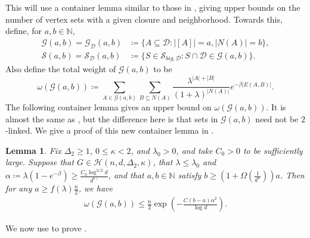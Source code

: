 \documentclass[reqno,a4paper,11pt]{amsart}
\newtheorem{lemma}[theorem]{Lemma}
\newcommand{\cD}{\mathcal{D}}
\newcommand{\cG}{\mathcal{G}}
\newcommand{\cS}{\mathcal{S}}
\newcommand{\lam}{\lambda}
\newcommand{\om}{\omega}
\newcommand{\ex}{\kappa}
\newcommand{\exx}{C_*}
\newcommand{\codeg}{\Delta_2}
\begin{document}
This will use a container lemma similar to those in \cite{galvin2011threshold, GaTe2006, GeKaSaWdo25, jenssen2020independent}, giving upper bounds on the number of vertex sets with a given closure and neighborhood. Towards this, define, for $a, b \in \mathbb{N}$,
\begin{align*}
\cG(a, b) = \cG_{\cD}(a, b) &\coloneqq \{A \subseteq \cD : |[A]|=a, |N(A)|=b\},\\
%
\cS(a, b) = \cS_{\cD}(a, b) &\coloneqq \{S \in \cS_{big, \cD} : S \cap \cD \in \cG(a, b)\}.
\end{align*}
Also define the total weight of $\cG(a, b)$ to be
\[
\omega(\cG(a,b)) \coloneqq \sum_{A \in \cG(a, b)} \sum_{B \subseteq N(A)} \frac{\lambda^{|A|+|B|}}{(1+\lambda)^{|N(A)|}} e^{- \beta |E(A, B)|}.
\] 
The following container lemma gives an upper bound on $\om(\cG(a, b))$. It is almost the same as \cite[Lemma 4.2]{GeKaSaWdo25}, but the difference here is that sets in $\cG(a, b)$ need not be $2$-linked. We give a proof of this new container lemma in .

\begin{lemma} \label{lem:container_main}
Fix $\codeg \ge 1$, $0 \le \ex < 2$, and $\lam_0 > 0$, and take $C_0 > 0$ to be sufficiently large. Suppose that $G \in \mathcal{H}(n,d,\codeg,\ex)$, that $\lambda \le \lam_0$ and $\alpha \coloneqq \lam(1 - e^{-\beta}) \ge \frac{C_0 \log^{3/2} d}{d^{\exx}}$, and that $a,b \in \mathbb{N}$ satisfy $b \ge \left(1 + \Omega\left(\frac{1}{d^{\ex}}\right)\right)a$. Then for any $a \geq f(\lam) \frac{n}{2}$, we have
    \begin{align*}
        \omega(\cG(a, b)) \leq \frac{n}{2}\exp \left( -\frac{C(b - a)\alpha^2}{\log d} \right).
    \end{align*}
\end{lemma}

We now use  to prove .
\end{document}
